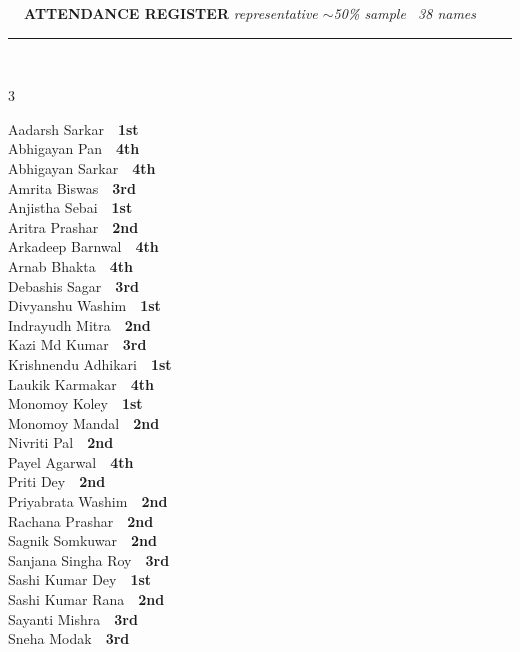 \documentclass[11pt,a4paper]{article}
\begin{document}
\vspace{3pt}\noindent
{\footnotesize\bfseries\color{Slate}\faListOl~~ATTENDANCE REGISTER}%
\hfill{\scriptsize\itshape\color{Slate}representative $\sim$50\% sample \textperiodcentered\ 38 names}\\[3pt]
{\color{Line}\rule{\linewidth}{0.5pt}}\\[5pt]
\begingroup\footnotesize\setlength{\columnsep}{20pt}\setlength{\parskip}{1pt}%
\begin{multicols}{3}\raggedright
Aadarsh Sarkar~\dotfill~\textbf{1st}\\
Abhigayan Pan~\dotfill~\textbf{4th}\\
Abhigayan Sarkar~\dotfill~\textbf{4th}\\
Amrita Biswas~\dotfill~\textbf{3rd}\\
Anjistha Sebai~\dotfill~\textbf{1st}\\
Aritra Prashar~\dotfill~\textbf{2nd}\\
Arkadeep Barnwal~\dotfill~\textbf{4th}\\
Arnab Bhakta~\dotfill~\textbf{4th}\\
Debashis Sagar~\dotfill~\textbf{3rd}\\
Divyanshu Washim~\dotfill~\textbf{1st}\\
Indrayudh Mitra~\dotfill~\textbf{2nd}\\
Kazi Md Kumar~\dotfill~\textbf{3rd}\\
Krishnendu Adhikari~\dotfill~\textbf{1st}\\
Laukik Karmakar~\dotfill~\textbf{4th}\\
Monomoy Koley~\dotfill~\textbf{1st}\\
Monomoy Mandal~\dotfill~\textbf{2nd}\\
Nivriti Pal~\dotfill~\textbf{2nd}\\
Payel Agarwal~\dotfill~\textbf{4th}\\
Priti Dey~\dotfill~\textbf{2nd}\\
Priyabrata Washim~\dotfill~\textbf{2nd}\\
Rachana Prashar~\dotfill~\textbf{2nd}\\
Sagnik Somkuwar~\dotfill~\textbf{2nd}\\
Sanjana Singha Roy~\dotfill~\textbf{3rd}\\
Sashi Kumar Dey~\dotfill~\textbf{1st}\\
Sashi Kumar Rana~\dotfill~\textbf{2nd}\\
Sayanti Mishra~\dotfill~\textbf{3rd}\\
Sneha Modak~\dotfill~\textbf{3rd}\\

\end{multicols}
\end{document}
